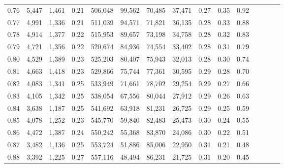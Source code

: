 \begin{tabular}{rrrcrrrrrrrrrrr}
0.76 &   5,447 &   1,461 &                                       0.21 &  506,048 &   99,562 &   70,485 &   37,471 &  0.27 &  0.35 &                         0.92 \\
0.77 &   4,991 &   1,336 &                                       0.21 &  511,039 &   94,571 &   71,821 &   36,135 &  0.28 &  0.33 &                         0.88 \\
0.78 &   4,914 &   1,377 &                                       0.22 &  515,953 &   89,657 &   73,198 &   34,758 &  0.28 &  0.32 &                         0.83 \\
0.79 &   4,721 &   1,356 &                                       0.22 &  520,674 &   84,936 &   74,554 &   33,402 &  0.28 &  0.31 &                         0.79 \\
0.80 &   4,529 &   1,389 &                                       0.23 &  525,203 &   80,407 &   75,943 &   32,013 &  0.28 &  0.30 &                         0.74 \\
0.81 &   4,663 &   1,418 &                                       0.23 &  529,866 &   75,744 &   77,361 &   30,595 &  0.29 &  0.28 &                         0.70 \\
0.82 &   4,083 &   1,341 &                                       0.25 &  533,949 &   71,661 &   78,702 &   29,254 &  0.29 &  0.27 &                         0.66 \\
0.83 &   4,105 &   1,342 &                                       0.25 &  538,054 &   67,556 &   80,044 &   27,912 &  0.29 &  0.26 &                         0.63 \\
0.84 &   3,638 &   1,187 &                                       0.25 &  541,692 &   63,918 &   81,231 &   26,725 &  0.29 &  0.25 &                         0.59 \\
0.85 &   4,078 &   1,252 &                                       0.23 &  545,770 &   59,840 &   82,483 &   25,473 &  0.30 &  0.24 &                         0.55 \\
0.86 &   4,472 &   1,387 &                                       0.24 &  550,242 &   55,368 &   83,870 &   24,086 &  0.30 &  0.22 &                         0.51 \\
0.87 &   3,482 &   1,136 &                                       0.25 &  553,724 &   51,886 &   85,006 &   22,950 &  0.31 &  0.21 &                         0.48 \\
0.88 &   3,392 &   1,225 &                                       0.27 &  557,116 &   48,494 &   86,231 &   21,725 &  0.31 &  0.20 &                         0.45 \\

\end{tabular}

